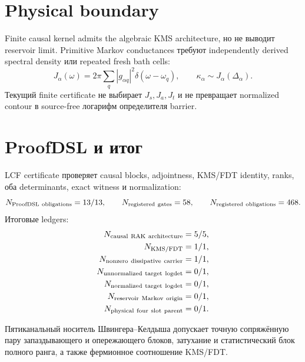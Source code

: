 \section{Physical boundary}

Finite causal kernel admits the algebraic KMS architecture, но не выводит
reservoir limit. Primitive Markov conductances требуют independently
derived spectral density или repeated fresh bath cells:
\begin{equation}
 J_\alpha(\omega)
 =2\pi\sum_q|g_{\alpha q}|^2\delta(\omega-\omega_q),
 \qquad
 \kappa_\alpha\sim J_\alpha(\Delta_\alpha).
 \label{eq:v9-kms-keldysh-spectral-density-boundary}
\end{equation}
Текущий finite certificate не выбирает $J_s,J_a,J_t$ и не превращает
normalized contour в source-free логарифм определителя barrier.

\section{ProofDSL и итог}

LCF certificate проверяет causal blocks, adjointness, KMS/FDT identity,
ranks, оба determinants, exact witness и normalization:
\begin{equation}
 N_{\rm ProofDSL\ obligations}=13/13,
 \qquad N_{\rm registered\ gates}=58,
 \qquad N_{\rm registered\ obligations}=468.
 \label{eq:v9-kms-keldysh-proofdsl}
\end{equation}
Итоговые ledgers:
\begin{equation}
 \begin{aligned}
 N_{\rm causal\ RAK\ architecture}&=5/5,\\
 N_{\rm KMS/FDT}&=1/1,\\
 N_{\rm nonzero\ dissipative\ carrier}&=1/1,\\
 N_{\rm unnormalized\ target\ logdet}&=0/1,\\
 N_{\rm normalized\ target\ logdet}&=0/1,\\
 N_{\rm reservoir\ Markov\ origin}&=0/1,\\
 N_{\rm physical\ four\ slot\ parent}&=0/1.
 \end{aligned}
 \label{eq:v9-kms-keldysh-ledger}
\end{equation}

\begin{theorem}
Пятиканальный носитель Швингера--Келдыша допускает точную сопряжённую пару
запаздывающего и опережающего блоков, затухание и статистический блок полного
ранга, а также фермионное соотношение KMS/FDT.
\end{theorem}

